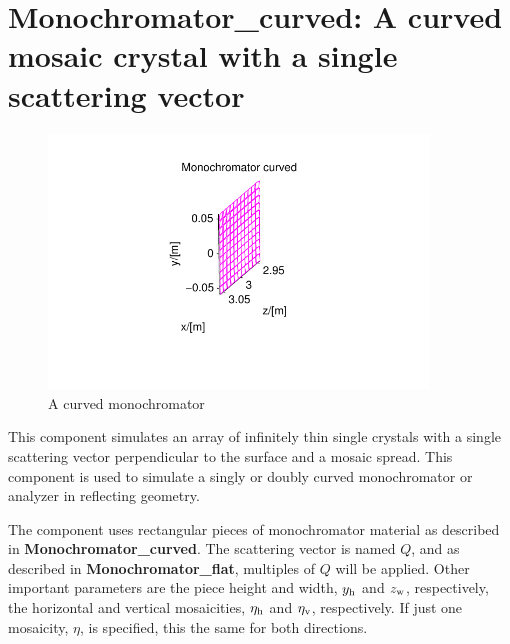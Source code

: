 \section{Monochromator\_curved: A curved mosaic crystal with
a single scattering vector}
\label{s:monochromator_curved}


\begin{figure}
  \begin{center}
    \includegraphics[width=0.9\textwidth]{figures/monochromator_curved}
  \end{center}
\caption{A curved monochromator}
\label{f:monochromator_curved}
\end{figure}


This component simulates an array of infinitely thin single
crystals with a single scattering vector perpendicular to the
surface and a mosaic spread.
This component is used to simulate a singly or doubly
curved monochromator or analyzer in reflecting geometry.

The component uses rectangular pieces of monochromator material
as described in {\bf Monochromator\_curved}.
The scattering vector is named $Q$, and as described in
{\bf Monochromator\_flat}, multiples of $Q$ will be applied.
Other important parameters are the piece height and width,
$y_{\rm h}$ and $z_{\rm w}$, respectively, the
horizontal and vertical mosaicities, $\eta_{\rm h}$ and $\eta_{\rm v}$,
respectively.
If just one mosaicity, $\eta$, is specified, this the same for both directions.

